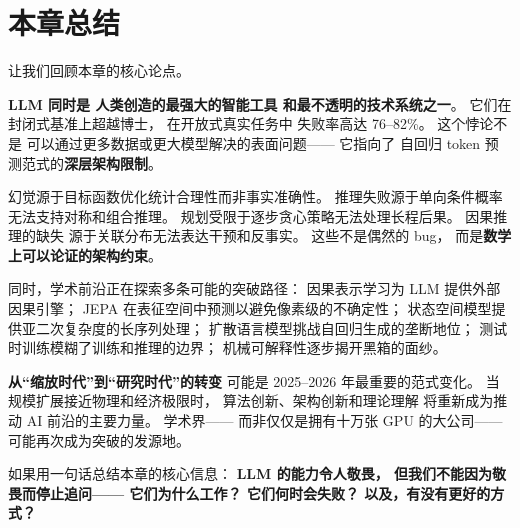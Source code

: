 \section{本章总结}
\label{sec:limitations-summary}

让我们回顾本章的核心论点。

\textbf{LLM 同时是
人类创造的最强大的智能工具
和最不透明的技术系统之一}。
它们在封闭式基准上超越博士，
在开放式真实任务中
失败率高达 76--82\%。
这个悖论不是
可以通过更多数据或更大模型解决的表面问题——
它指向了
自回归 token 预测范式的\textbf{深层架构限制}。

幻觉源于目标函数优化统计合理性而非事实准确性。
推理失败源于单向条件概率无法支持对称和组合推理。
规划受限于逐步贪心策略无法处理长程后果。
因果推理的缺失
源于关联分布无法表达干预和反事实。
这些不是偶然的 bug，
而是\textbf{数学上可以论证的架构约束}。

同时，学术前沿正在探索多条可能的突破路径：
因果表示学习为 LLM 提供外部因果引擎；
JEPA 在表征空间中预测以避免像素级的不确定性；
状态空间模型提供亚二次复杂度的长序列处理；
扩散语言模型挑战自回归生成的垄断地位；
测试时训练模糊了训练和推理的边界；
机械可解释性逐步揭开黑箱的面纱。

\textbf{从``缩放时代''到``研究时代''的转变}
可能是 2025--2026 年最重要的范式变化。
当规模扩展接近物理和经济极限时，
算法创新、架构创新和理论理解
将重新成为推动 AI 前沿的主要力量。
学术界——
而非仅仅是拥有十万张 GPU 的大公司——
可能再次成为突破的发源地。

如果用一句话总结本章的核心信息：
\textbf{LLM 的能力令人敬畏，
但我们不能因为敬畏而停止追问——
它们为什么工作？
它们何时会失败？
以及，有没有更好的方式？}
